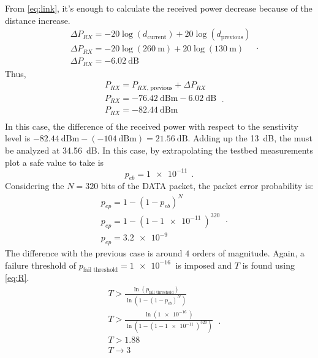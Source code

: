 From \eqref{eq:link}, it's enough to calculate the received power decrease because of the distance increase.
\begin{equation}
	\begin{split}
	&	\Delta P_{RX} = - 20 \log \left( d_{\text{current}} \right)  + 20 \log \left( d_{\text{previous}} \right)  \\
	&	\Delta P_{RX} = - 20 \log \left( \SI{260}{\m} \right)  + 20 \log \left( \SI{130}{\m} \right)  \\
	&	\Delta P_{RX} = - \SI{6.02}{\dB}
	\end{split} \ .
\end{equation}
Thus,
\begin{equation}
	\begin{split}
		& P_{RX} = P_{RX \text{, previous}} + \Delta P_{RX} \\
		& P_{RX} = - \SI{76.42}{\dB}\text{m} - \SI{6.02}{\dB} \\
		& P_{RX} = - \SI{82.44}{\dB}\text{m} \\
	\end{split} \ .
\end{equation}
In this case, the difference of the received power with respect to the senstivity level is $\SI{-82.44}{\dB}\text{m} - \left( - \SI{104}{\dB}\text{m} \right) = \SI{21.56}{\dB}$. Adding up the \SI{13}{\dB}, the  must be analyzed at \SI{34.56}{\dB}. In this case, by extrapolating the testbed measurements plot a safe value to take is
\begin{equation}
	p_{eb} = \SI{1e-11}{} \ .
\end{equation}
Considering the $N = 320$ bits of the DATA packet, the packet error probability is:
\begin{equation}
	\begin{split}
		& p_{ep} = 1 - \left( 1 - p_{eb} \right)^N \\
		& p_{ep} = 1 - \left( 1 - \SI{1e-11}{} \right)^{320} \\
		& p_{ep} = \SI{3.2e-9}{}
	\end{split} \ .
\end{equation}
The difference with the previous case is around $4$ orders of magnitude. Again, a failure threshold of $p_{\text{fail threshold}} = \SI{1e-16}{}$ is imposed and $T$ is found using \eqref{eq:R}.
\begin{equation}
	\begin{split}
		& T > \frac{\ln \left( p_{\text{fail threshold}}  \right) }{\ln \left( 1 - \left( 1 - p_{eb} \right)^N \right) } \\
		& T > \frac{\ln \left( \SI{1e-16}{} \right) }{\ln \left( 1 - \left( 1 - \SI{1e-11}{} \right)^{320} \right) } \\
		& T > 1.88 \\
		& T \rightarrow 3 \\
	\end{split} \ .
\end{equation}
